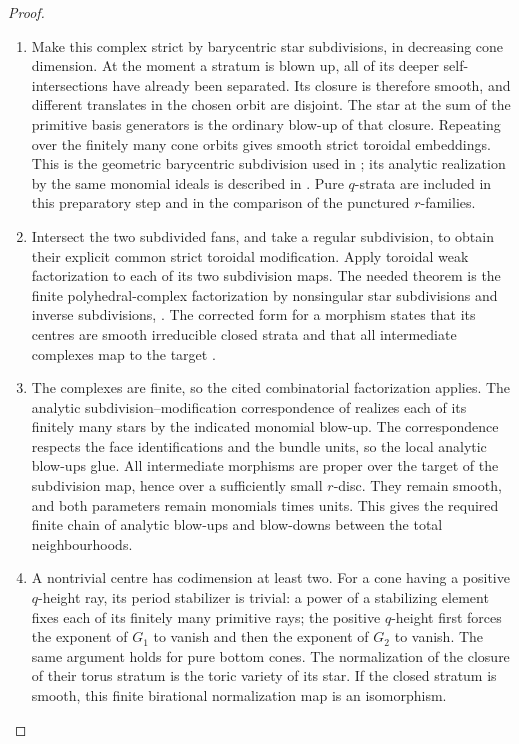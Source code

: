 \begin{proof}
\begin{enumerate}[label=\arabic*.,leftmargin=*]
\item Make this complex strict by barycentric star subdivisions,
in decreasing cone dimension. At the moment a stratum
is blown up, all of its deeper self-intersections have
already been separated. Its closure is therefore smooth,
and different translates in the chosen orbit are disjoint.
The star at the sum of the primitive basis generators is
the ordinary blow-up of that closure. Repeating over the
finitely many cone orbits gives smooth strict toroidal
embeddings. This is the geometric barycentric subdivision
used in \cite[Section 5.6, pp.565--566]{AKMW02AB}; its
analytic realization by the same monomial ideals is
described in \cite[Section~5.5, pp.~564--565]{AKMW02AB}. Pure $q$-strata
are included in this preparatory step and in the comparison of
the punctured $r$-families.

\item Intersect the two subdivided fans, and take a regular
subdivision, to obtain their explicit common strict
toroidal modification. Apply toroidal weak factorization
to each of its two subdivision maps. The needed theorem
is the finite polyhedral-complex factorization by
nonsingular star subdivisions and inverse subdivisions,
\cite[Theorem~1.6.1, p.~543; Theorem~2.7.1, pp.~551--552]{AKMW02AB}. The corrected
form for a morphism states that its centres are smooth
irreducible closed strata and that all intermediate
complexes map to the target
\cite[Section 2, p.2]{Matsuki00ErrAB}.

\item The complexes are finite, so the cited combinatorial
factorization applies. The analytic
subdivision--modification correspondence of
\cite[Section~5.5, pp.~564--565]{AKMW02AB} realizes each of its finitely
many stars by the indicated monomial blow-up.
The correspondence respects the face identifications
and the bundle units, so the local analytic blow-ups
glue. All intermediate morphisms are proper over the
target of the subdivision map, hence over a sufficiently
small $r$-disc. They remain smooth, and both parameters
remain monomials times units. This gives the required
finite chain of analytic blow-ups and blow-downs
between the total neighbourhoods.

\item  A
nontrivial centre has codimension at least two. For a
cone having a positive $q$-height ray, its period
stabilizer is trivial: a power of a stabilizing element
fixes each of its finitely many primitive rays; the
positive $q$-height first forces the exponent of $G_1$
to vanish and then the exponent of $G_2$ to vanish.
The same argument holds for pure bottom cones. The normalization of the closure of their torus stratum
is the toric variety of its star. If the closed stratum
is smooth, this finite birational normalization map is
an isomorphism.


\end{enumerate}
\end{proof}
